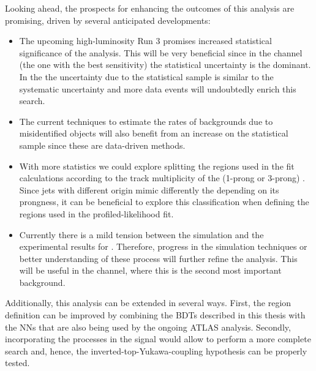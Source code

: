 Looking ahead, the prospects for enhancing the outcomes of this analysis are promising, driven by several anticipated developments:
\begin{itemize}
	\item The upcoming high-luminosity Run 3 promises increased statistical significance of the analysis.
		This will be very beneficial since in the \dilepSStau channel (the one with the best sensitivity)
		the statistical uncertainty is the dominant. In the \dilepOStau the uncertainty due to the statistical
		sample is similar to the systematic uncertainty and more data events will undoubtedly enrich this search.

	\item The current techniques to estimate the rates of backgrounds due to misidentified objects will also
		benefit from an increase on the statistical sample since these are data-driven methods.
		
	\item With more statistics we could explore splitting the regions used in the fit calculations
		according to the track multiplicity of the \tauhad (1-prong or 3-prong) . %
		Since jets with different origin mimic differently the \tauhad depending on its prongness,
		it can be beneficial to explore this classification when defining the regions used in
		the profiled-likelihood fit.
		
	\item Currently there is a mild tension between the simulation and the experimental results for \ttW. 
		Therefore, progress in the simulation techniques or better understanding of these process will
		further refine the analysis. This will be useful in the \dilepSStau channel, where this is the second
		most important background.
\end{itemize}


Additionally, this analysis can be extended in several ways.
First, the region definition can be improved by combining the BDTs described in this
thesis with the NNs that are also being used by the ongoing ATLAS analysis. 
Secondly, incorporating the \tWH processes in the signal would allow to perform
a more complete \tH search and, hence, the inverted-top-Yukawa-coupling hypothesis 
can be properly tested.

